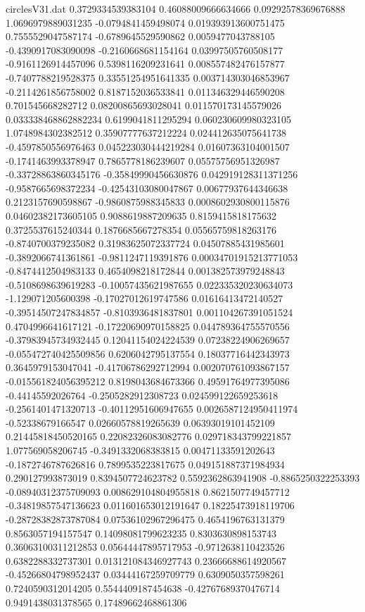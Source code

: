 \begin{filecontents}{circlesV31.dat}
0.3729334539383104	0.46088009666634666	0.09292578369676888
1.0696979889031235	-0.0794841459498074	0.019393913600751475
0.7555529047587174	-0.6789645529590862	0.0059477043788105
-0.4390917083090098	-0.2160668681154164	0.03997505760508177
-0.9161126914457096	0.5398116209231641	0.008557482476157877
-0.7407788219528375	0.33551254951641335	0.003714303046853967
-0.2114261856758002	0.8187152036533841	0.011346329446590208
0.701545668282712	0.08200865693028041	0.011570173145579026
0.033338468862882234	0.6199041811295294	0.060230609980323105
1.0748984302382512	0.35907777637212224	0.024412635075641738
-0.4597850556976463	0.045223030444219284	0.01607363104001507
-0.1741463993378947	0.7865778186239607	0.05575756951326987
-0.33728863860345176	-0.35849990456630876	0.042919128311371256
-0.9587665698372234	-0.42543103080047867	0.00677937644346638
0.2123157690598867	-0.9860875988345833	0.0008602930800115876
0.04602382173605105	0.9088619887209635	0.8159415818175632
0.3725537615240344	0.1876685667278354	0.05565759818263176
-0.8740700379235082	0.31983625072337724	0.04507885431985601
-0.3892066741361861	-0.9811247119391876	0.00034701915213771053
-0.8474412504983133	0.4654098218172844	0.001382573979248843
-0.5108698639619283	-0.10057435621987655	0.022335320230634073
-1.129071205600398	-0.17027012619747586	0.01616413472140527
-0.39514507247834857	-0.8103936481837801	0.001104267391051524
0.4704996641617121	-0.17220690970158825	0.044789364755570556
-0.37983945734932445	0.12041154024224539	0.07238224906269657
-0.055472740425509856	0.6206042795137554	0.18037716442343973
0.3645979153047041	-0.41706786292712994	0.002070761093867157
-0.015561824056395212	0.8198043684673366	0.49591764977395086
-0.44145592026764	-0.2505282912308723	0.024599122659253618
-0.2561401471320713	-0.40112951606947655	0.0026587124950411974
-0.52338679166547	0.02660578819265639	0.06393019101452109
0.21445818450520165	0.22082326083082776	0.029718343799221857
1.077569058206745	-0.3491332068383815	0.00471133591202643
-0.1872746787626816	0.7899535223817675	0.049151887371984934
0.290127993873019	0.8394507724623782	0.5592362863941908
-0.8865250322253393	-0.08940312375709093	0.008629104804955818
0.8621507749457712	-0.34819857547136623	0.011601653012191647
0.18225473918119706	-0.28728382873787084	0.07536102967296475
0.4654196763131379	0.8563057194157547	0.14098081799623235
0.8303630898153743	0.36063100311212853	0.05644447895717953
-0.9712638110423526	0.6382288332737301	0.013121084346927743
0.23666688614920567	-0.45266804798952437	0.03444167259709779
0.6309050357598261	0.7240590312014205	0.5544409187454638
-0.42767689370476714	0.9491438031378565	0.17489662468861306

\end{filecontents}
